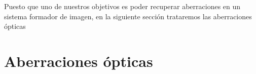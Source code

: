 %
%
%




Puesto que uno de nuestros objetivos es poder recuperar aberraciones en un sistema formador de imagen, en la siguiente sección trataremos las aberraciones ópticas

\section{Aberraciones ópticas}
\label{sec:aberraciones}

